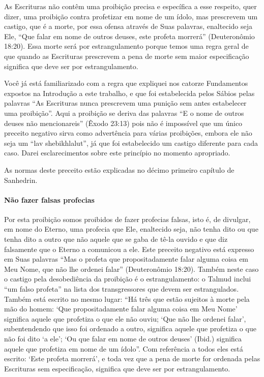 As Escrituras não contêm uma proibição precisa e específica a esse
respeito, quer dizer, uma proibição contra profetizar em nome de um
ídolo, mas prescrevem um castigo, que é a morte, por essa ofensa através
de Suas palavras, enaltecido seja Ele, ``Que falar em nome de outros
deuses, este profeta morrerá'' (Deuteronômio 18:20). Essa morte será por
estrangulamento porque temos uma regra geral de que quando as Escrituras
prescrevem a pena de morte sem maior especificação significa que deve
ser por estrangulamento.

Você já está familiarizado com a regra que expliquei nos catorze
Fundamentos expostos na Introdução a este trabalho, e que foi
estabelecida pelos Sábios pelas palavras ``As Escrituras nunca
prescrevem uma punição sem antes estabelecer uma proibição''. Aqui a
proibição se deriva das palavras ``E o nome de outros deuses não
mencionareis'' (Êxodo 23:13) pois não é impossível que um único
preceito negativo sirva como advertência para várias proibições, embora
ele não seja um ``lav shebikhlalut'', já que foi estabelecido um castigo
diferente para cada caso. Darei esclarecimentos sobre este princípio no
momento apropriado.

As normas deste preceito estão explicadas no décimo primeiro capítulo
de Sanhedrin.

\paragraph{Não fazer falsas profecias}

Por esta proibição somos proibidos de fazer profecias falsas, isto é,
de divulgar, em nome do Eterno, uma profecia que Ele, enaltecido seja,
não tenha dito ou que tenha dito a outro que não aquele que se gaba de tê-la
ouvido e que diz falsamente que o Eterno a comunicou a ele. Este
preceito negativo está expresso em Suas palavras ``Mas o profeta que propositadamente
falar alguma coisa em Meu Nome, que não lhe ordenei falar''
(Deuteronômio 18:20).
Também neste caso o castigo pela desobediência da proibição é o
estrangulamento: o Talmud inclui ``um falso profeta'' na lista dos
transgressores que devem ser estrangulados. Também está escrito no mesmo
lugar: ``Há três que estão sujeitos à morte pela mão do homem: `Que propositadamente
falar alguma coisa em Meu Nome' significa aquele que profetiza o que ele
não ouviu; `Que não lhe ordenei falar', subentendendo que isso foi
ordenado a outro, significa aquele que profetiza o que não foi dito `a
ele'; `Ou que falar em nome de outros deuses' (Ibid.) significa aquele
que profetiza em nome de um ídolo''. Com referência a todos eles está
escrito: `Este profeta morrerá', e toda vez que a pena de morte for
ordenada pelas Escrituras sem especificação, significa que deve ser por
estrangulamento.

